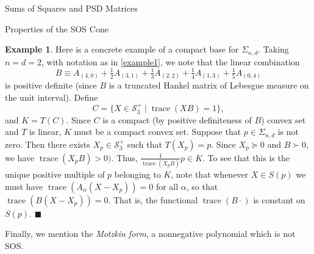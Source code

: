 \documentclass[12pt,oneside,final]{ucthesisucsbmath2010}
\newcommand{\QED}{\blacksquare}
\newcommand{\s}{\mathcal{S}}
\newcommand{\snd}{\Sigma_{n,d}}
\DeclareMathOperator{\trace}{trace}
\theoremstyle{definition}
\newtheorem{examp}[thm]{Example}
\begin{document}
\begin{chapter}{Sums of Squares and PSD Matrices}
\begin{section}{Properties of the SOS Cone}
\begin{examp}
Here is a concrete example of a compact base for $\snd$. Taking $n=d=2$, with notation as in \ref{example1}, we note that the linear combination
\[B\equiv A_{(4,0)}+\tfrac{1}{2}A_{(3,1)}+\tfrac{1}{3}A_{(2,2)}+\tfrac{1}{4}A_{(1,3)}+\tfrac{1}{5}A_{(0,4)}\]
is positive definite (since $B$ is a truncated Hankel matrix of Lebesgue measure on the unit interval). Define 
\[C = \{ X \in \s_3^+ \mid \trace(XB) = 1\},\]
and $K=T(C)$. Since $C$ is a compact (by positive definiteness of $B$) convex set and $T$ is linear, $K$ must be a compact convex set. Suppose that $p \in \snd$ is not zero. Then there exists $X_p \in \s_3^+$ such that $T(X_p) = p$. Since $X_p \succeq 0$ and $B \succ 0$, we have $\trace(X_pB) >0)$. Thus, $\tfrac{1}{\trace(X_pB)}p \in K$. To see that this is the unique positive multiple of $p$ belonging to $K$, note that whenever $X \in S(p)$ we must have $\trace(A_\alpha(X-X_p))=0$ for all $\alpha$, so that $\trace(B(X-X_p)) = 0$. That is, the functional $\trace(B\cdot)$ is constant on $S(p)$. $\QED$
\label{example2}
\end{examp}

Finally, we mention the \emph{Motzkin form}, a nonnegative polynomial which is not SOS.


\end{section}
\end{chapter}
\end{document}
